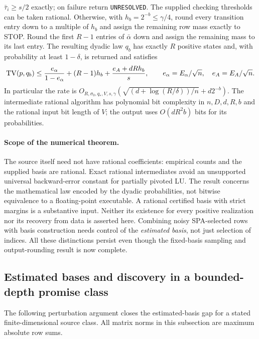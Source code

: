 \begin{theorem}
$\bar\tau_i\ge s/2$ exactly; on failure return
\texttt{UNRESOLVED}. The supplied checking thresholds can be taken
rational. Otherwise, with $h_b=2^{-b}\le\gamma/4$, round
every transition entry down to a multiple of $h_b$ and assign the
remaining row mass exactly to STOP. Round the first $R-1$ entries of
$\bar\alpha$ down and assign the remaining mass to its last entry.
The resulting dyadic law $q_b$ has exactly $R$ positive states and,
with probability at least $1-\delta$, is returned and satisfies
\begin{equation}
 \operatorname{TV}(p,q_b)\le
 \frac{e_\alpha}{1-e_\alpha}+(R-1)h_b
          +\frac{e_A+dRh_b}{s},\qquad
 e_\alpha=E_\alpha/\sqrt n,\quad e_A=E_A/\sqrt n.
 \label{II:U:eq:fixed-basis-tv}
\end{equation}
In particular the rate is
$O_{R,\sigma_0,q_*,V,s,\gamma}
(\sqrt{(d+\log(R/\delta))/n}+d2^{-b})$.
The intermediate rational algorithm has polynomial bit complexity
in $n,D,d,R,b$ and the rational input bit length of $V$;
the output uses $O(dR^2b)$ bits for its probabilities.
\end{theorem}


\paragraph{Scope of the numerical theorem.}
The source itself need not have rational coefficients: empirical
counts and the supplied basis are rational. Exact rational
intermediates avoid an unsupported universal backward-error constant
for partially pivoted LU. The result concerns the mathematical law
encoded by the dyadic probabilities, not bitwise equivalence to a
floating-point executable. A rational certified basis with strict
margins is a substantive input. Neither its existence for every
positive realization nor its recovery from data is asserted here.
Combining noisy SPA-selected rows with basis construction needs
control of the \emph{estimated basis}, not just selection of indices.
All these distinctions persist even though the fixed-basis sampling
and output-rounding result is now complete.

\subsection{Estimated bases and discovery in a bounded-depth promise class}
\label{II:U:sec:learned-basis}
The following perturbation argument closes the estimated-basis gap
for a stated finite-dimensional source class. All matrix norms in
this subsection are maximum absolute row sums.

